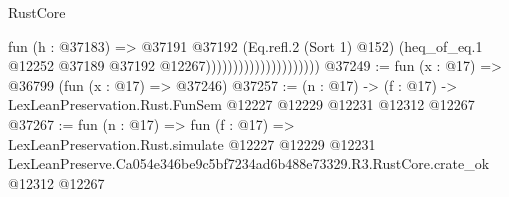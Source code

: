 \begin{lexlean}{RustCore}
\begin{coremodule}
                                          fun (h : @37183) =>
                                          @37191
                                            @37192
                                            (Eq.refl.{2} (Sort 1) @152)
                                            (heq_of_eq.{1}
                                              @12252
                                              @37189
                                              @37192
                                              @12267)))))))))))))))))))))
@37249 := fun (x : @17) => @36799 (fun (x : @17) => @37246)
@37257 := (n : @17) ->
  (f : @17) -> LexLeanPreservation.Rust.FunSem @12227 @12229 @12231 @12312 @12267
@37267 := fun (n : @17) =>
  fun (f : @17) =>
  LexLeanPreservation.Rust.simulate
    @12227
    @12229
    @12231
    LexLeanPreserve.Ca054e346be9c5bf7234ad6b488e73329.R3.RustCore.crate_ok
    @12312
    @12267
\end{coremodule}
\end{lexlean}
